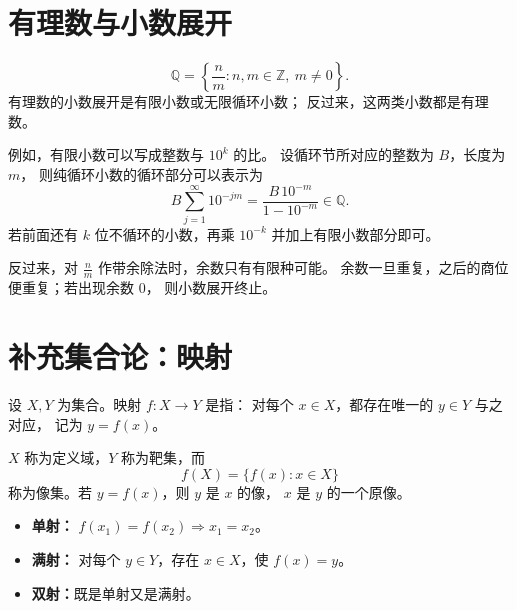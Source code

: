 \documentclass[UTF8,11pt]{ctexart}
\theoremstyle{cnthm}
\begin{document}
\section{有理数与小数展开}

\[
\mathbb Q
=
\left\{\frac nm:n,m\in\mathbb Z,\ m\ne0\right\}.
\]
有理数的小数展开是有限小数或无限循环小数；
反过来，这两类小数都是有理数。

例如，有限小数可以写成整数与 \(10^k\) 的比。
设循环节所对应的整数为 \(B\)，长度为 \(m\)，
则纯循环小数的循环部分可以表示为
\[
B\sum_{j=1}^{\infty}10^{-jm}
=
\frac{B\,10^{-m}}{1-10^{-m}}\in\mathbb Q.
\]
若前面还有 \(k\) 位不循环的小数，再乘 \(10^{-k}\)
并加上有限小数部分即可。

反过来，对 \(\frac nm\) 作带余除法时，余数只有有限种可能。
余数一旦重复，之后的商位便重复；若出现余数 \(0\)，
则小数展开终止。

\section{补充集合论：映射}

设 \(X,Y\) 为集合。映射 \(f:X\to Y\) 是指：
对每个 \(x\in X\)，都存在唯一的 \(y\in Y\) 与之对应，
记为 \(y=f(x)\)。

\(X\) 称为定义域，\(Y\) 称为靶集，而
\[
f(X)=\{f(x):x\in X\}
\]
称为像集。若 \(y=f(x)\)，则 \(y\) 是 \(x\) 的像，
\(x\) 是 \(y\) 的一个原像。

\begin{itemize}
\item \textbf{单射：}
\(f(x_1)=f(x_2)\Rightarrow x_1=x_2\)。
\item \textbf{满射：}
对每个 \(y\in Y\)，存在 \(x\in X\)，使 \(f(x)=y\)。
\item \textbf{双射：}既是单射又是满射。
\end{itemize}
\end{document}
